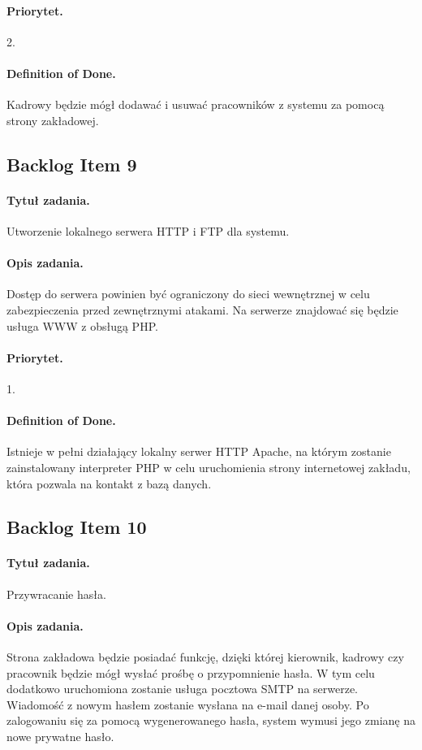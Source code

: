 \documentclass[a4paper]{article}
\begin{document}
\paragraph{Priorytet.} 2.
\paragraph{Definition of Done.} Kadrowy będzie mógł dodawać i usuwać pracowników z systemu za pomocą strony zakładowej.

\subsection{Backlog Item 9}
\paragraph{Tytuł zadania.} Utworzenie lokalnego serwera HTTP i FTP dla systemu.
\paragraph{Opis zadania.} Dostęp do serwera powinien być ograniczony do sieci wewnętrznej w celu zabezpieczenia przed zewnętrznymi atakami. Na serwerze znajdować się będzie usługa WWW z obsługą PHP.
\paragraph{Priorytet.} 1.
\paragraph{Definition of Done.} Istnieje w pełni działający lokalny serwer HTTP Apache, na którym zostanie zainstalowany interpreter PHP w celu uruchomienia strony internetowej zakładu, która pozwala na kontakt z bazą danych.

\subsection{Backlog Item 10}
\paragraph{Tytuł zadania.} Przywracanie hasła.
\paragraph{Opis zadania.} Strona zakładowa będzie posiadać funkcję, dzięki której kierownik, kadrowy czy pracownik będzie mógł wysłać prośbę o przypomnienie hasła. W tym celu dodatkowo uruchomiona zostanie usługa pocztowa SMTP na serwerze. Wiadomość z nowym hasłem zostanie wysłana na e-mail danej osoby. Po zalogowaniu się za pomocą wygenerowanego hasła, system wymusi jego zmianę na nowe prywatne hasło.
\end{document}

